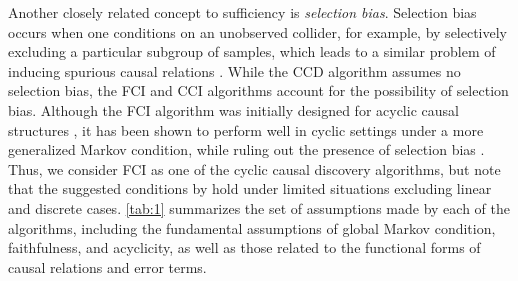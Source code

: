 \documentclass[twoside, 11pt]{article}
\begin{document}
Another closely related concept to sufficiency is \textit{selection bias}. Selection bias occurs when one conditions on an unobserved collider, for example, by selectively excluding a particular subgroup of samples, which leads to a similar problem of inducing spurious causal relations \citep{versteeg_local_2022, haslbeck_sum_2022}. While the CCD algorithm assumes no selection bias, the FCI and CCI algorithms account for the possibility of selection bias. Although the FCI algorithm was initially designed for acyclic causal structures \citep{spirtes2000}, it has been shown to perform well in cyclic settings under a more generalized Markov condition, while ruling out the presence of selection bias \citep{mooij_classen2020}. Thus, we consider FCI as one of the cyclic causal discovery algorithms, but note that the suggested conditions by \cite{mooij_classen2020} hold under limited situations excluding linear and discrete cases. \autoref{tab:1} summarizes the set of assumptions made by each of the algorithms, including the fundamental assumptions of global Markov condition, faithfulness, and acyclicity, as well as those related to the functional forms of causal relations and error terms.




\end{document}
